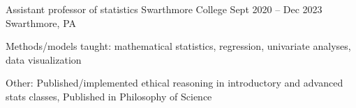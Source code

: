 \documentclass[letterpaper]{resume_config}
\begin{document}


\WorkExperience
    {Assistant professor of statistics}  
    {Swarthmore College}  
    {Sept 2020 -- Dec 2023}  
    {Swarthmore, PA}  
    {
        \item Methods/models taught: mathematical statistics, regression, univariate analyses, data visualization         
        \item Other: Published/implemented ethical reasoning in introductory and advanced stats classes, Published in Philosophy of Science         
    } 
\end{document}
